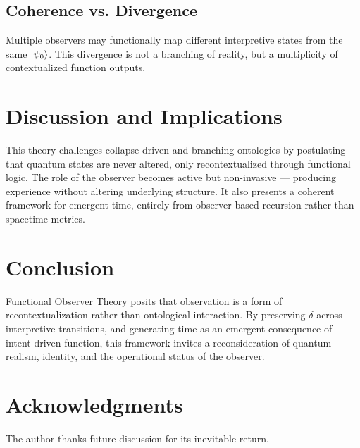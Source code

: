 \documentclass[12pt]{article}
\begin{document}
\subsection{Coherence vs. Divergence}
Multiple observers may functionally map different interpretive states from the same $\ket{\psi_0}$. This divergence is not a branching of reality, but a multiplicity of contextualized function outputs.

\section{Discussion and Implications}
This theory challenges collapse-driven and branching ontologies by postulating that quantum states are never altered, only recontextualized through functional logic. The role of the observer becomes active but non-invasive --- producing experience without altering underlying structure. It also presents a coherent framework for emergent time, entirely from observer-based recursion rather than spacetime metrics.

\section{Conclusion}
Functional Observer Theory posits that observation is a form of recontextualization rather than ontological interaction. By preserving $\delta$ across interpretive transitions, and generating time as an emergent consequence of intent-driven function, this framework invites a reconsideration of quantum realism, identity, and the operational status of the observer.

\section*{Acknowledgments}
The author thanks future discussion for its inevitable return.
\end{document}
